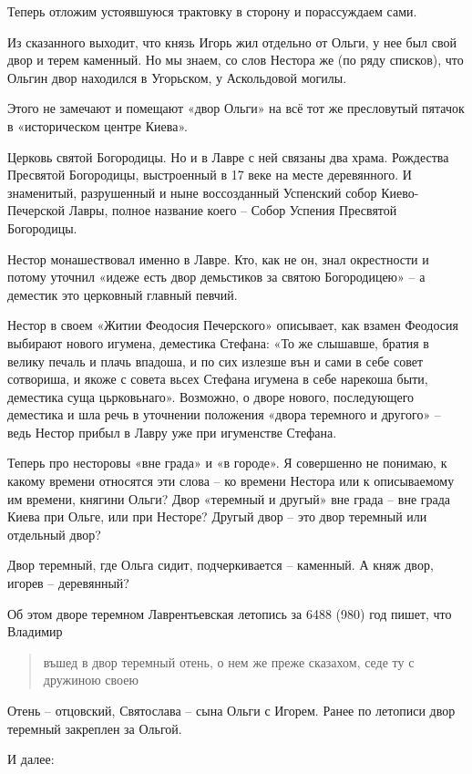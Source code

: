 \documentclass[a5paper,11pt,openany]{article}
\begin{document}
Теперь отложим устоявшуюся трактовку в сторону и порассуждаем сами.

Из сказанного выходит, что князь Игорь жил отдельно от Ольги, у нее был свой двор и терем каменный. Но мы знаем, со слов Нестора же (по ряду списков), что Ольгин двор находился в Угорьском, у Аскольдовой могилы.

Этого не замечают и помещают «двор Ольги» на всё тот же пресловутый пятачок в «историческом центре Киева».

Церковь святой Богородицы. Но и в Лавре с ней связаны два храма. Рождества Пресвятой Богородицы, выстроенный в 17 веке на месте деревянного. И знаменитый, разрушенный и ныне воссозданный Успенский собор Киево-Печерской Лавры, полное название коего – Собор Успения Пресвятой Богородицы.

Нестор монашествовал именно в Лавре. Кто, как не он, знал окрестности и потому уточнил «идеже есть двор демьстиков за святою Богородицею» – а деместик это церковный главный певчий.

Нестор в своем «Житии Феодосия Печерского» описывает, как взамен Феодосия выбирают нового игумена, деместика Стефана: «То же слышавше, братия в велику печаль и плачь впадоша, и по сих излезше вън и сами в себе совет сотвориша, и якоже с совета вьсех Стефана игумена в себе нарекоша быти, деместика суща цьрковьнаго». Возможно, о дворе нового, последующего деместика и шла речь в уточнении положения «двора теремного и другого» – ведь Нестор прибыл в Лавру уже при игуменстве Стефана.

Теперь про несторовы «вне града» и «в городе». Я совершенно не понимаю, к какому времени относятся эти слова – ко времени Нестора или к описываемому им времени, княгини Ольги? Двор «теремный и другый» вне града – вне града Киева при Ольге, или при Несторе? Другый двор – это двор теремный или отдельный двор?

Двор теремный, где Ольга сидит, подчеркивается – каменный. А княж двор, игорев – деревянный?

Об этом дворе теремном Лаврентьевская летопись за 6488 (980) год пишет, что Владимир 

\begin{quotation}
въшед в двор теремный отень, о нем же преже сказахом, седе ту с дружиною своею
\end{quotation}

Отень – отцовский, Святослава – сына Ольги с Игорем. Ранее по летописи двор теремный закреплен за Ольгой.

И далее:
\end{document}
